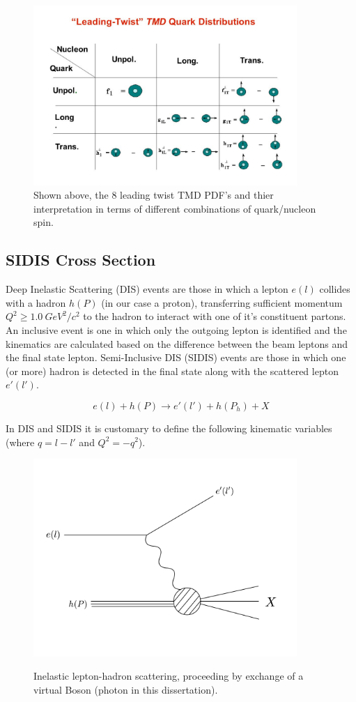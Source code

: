 \begin{figure}
  \centering
  \includegraphics[width=10cm]{image/tmd-table.jpg}
  \caption{Shown above, the 8 leading twist TMD PDF's and thier interpretation in terms of different combinations of quark/nucleon spin.}
  \label{fig:tmd-table}
\end{figure}

\subsection{SIDIS Cross Section}
Deep Inelastic Scattering (DIS) events are those in which a lepton $e(l)$ collides with a hadron $h(P)$ (in our case a proton), transferring sufficient momentum $Q^{2} \geq 1.0 \: GeV^{2}/c^{2}$ to the hadron to interact with one of it's constituent partons.  An inclusive event is one in which only the outgoing lepton is identified and the kinematics are calculated based on the difference between the beam leptons and the final state lepton.  Semi-Inclusive DIS (SIDIS) events are those in which one (or more) hadron is detected in the final state along with the scattered lepton $e'(l')$.  

\begin{equation}
  e(l) + h(P) \rightarrow e'(l') + h(P_{h}) + X 
\end{equation}

In DIS and SIDIS it is customary to define the following kinematic variables (where $q = l - l'$ and $Q^{2} = -q^{2}$). 

\begin{figure}
  \centering
  \includegraphics[width=10cm]{image/disFeynman.png}
  \label{fig:dis}
  \caption{ Inelastic lepton-hadron scattering, proceeding by exchange of a virtual Boson (photon in this dissertation). }
\end{figure}

